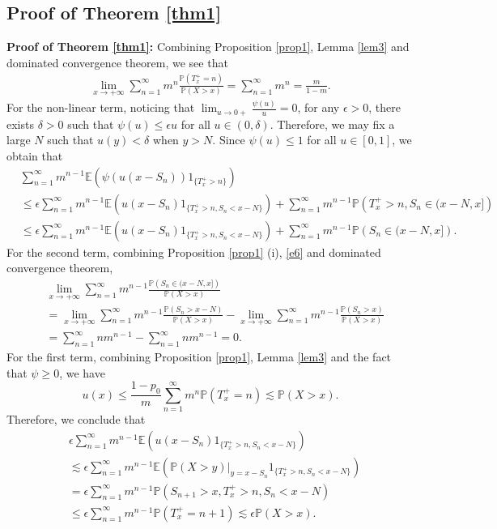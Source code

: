 \documentclass[11pt]{article}
\numberwithin{equation}{section}
\begin{document}
\subsection{Proof of Theorem \ref{thm1}}\label{S4.1}


\textbf{Proof of Theorem \ref{thm1}:} Combining Proposition \ref{prop1}, Lemma \ref{lem3} and dominated convergence theorem, we see that 
\begin{align}\label{e12-4}
	\lim_{x\to+\infty} \sum_{n=1}^\infty m^{n} \frac{ \mathbb{P}(T_x^+=n)}{\mathbb{P}(X>x)}=\sum_{n=1}^\infty m^{n} =\frac{m}{1-m}.
\end{align}
For the non-linear term, noticing that $\lim_{u\to 0+}\frac{\psi(u)}{u}=0$, for any $\epsilon>0$, there exists $\delta>0$ such that $\psi(u)\leq \epsilon u$ for all $u\in (0,\delta)$. Therefore, we may fix a large $N$ such that $u(y)<\delta$ when $y>N$.  Since $\psi(u)\leq 1$ for all $u\in [0,1]$, we obtain that 
\begin{align}\label{e12-1}
	& \sum_{n=1}^\infty m^{n-1}\mathbb{E}\left(\psi\left(u(x-S_n)\right)1_{\{T_x^+>n\}}\right) \nonumber\\
	& \leq \epsilon \sum_{n=1}^\infty m^{n-1}\mathbb{E}\left(u(x-S_n)1_{\{T_x^+>n, S_n<x-N\}}\right) +\sum_{n=1}^\infty m^{n-1}\mathbb{P}\left(T_x^+>n, S_n\in (x-N, x]\right) \nonumber\\
	& \leq \epsilon \sum_{n=1}^\infty m^{n-1}\mathbb{E}\left(u(x-S_n)1_{\{T_x^+>n, S_n<x-N\}}\right) +\sum_{n=1}^\infty m^{n-1}\mathbb{P}\left(S_n\in (x-N, x]\right).
\end{align}
For the second term, combining Proposition \ref{prop1} (i), \eqref{e6} and dominated convergence theorem,  
\begin{align}\label{e12-2}
	& \lim_{x\to+\infty} \sum_{n=1}^\infty m^{n-1}\frac{\mathbb{P}\left(S_n\in (x-N, x]\right)}{\mathbb{P}(X>x)} \nonumber\\
	& = \lim_{x\to+\infty} \sum_{n=1}^\infty m^{n-1}\frac{\mathbb{P}\left(S_n >x-N\right)}{\mathbb{P}(X>x)}  -\lim_{x\to+\infty} \sum_{n=1}^\infty m^{n-1}\frac{\mathbb{P}\left(S_n> x\right)}{\mathbb{P}(X>x)} \nonumber\\
	& = \sum_{n=1}^\infty n m^{n-1}- \sum_{n=1}^\infty n m^{n-1}=0.
\end{align}
For the first term, combining Proposition \ref{prop1}, Lemma \ref{lem3} and the fact that $\psi\geq 0$, we have 
\[
u(x)\leq \frac{1-p_0}{m}\sum_{n=1}^\infty m^{n} \mathbb{P}(T_x^+=n) \lesssim \mathbb{P}(X>x).
\]
Therefore, we conclude that 
\begin{align}\label{e12-3}
	&\epsilon \sum_{n=1}^\infty m^{n-1}\mathbb{E}\left(u(x-S_n)1_{\{T_x^+>n, S_n<x-N\}}\right) \nonumber\\
	& \lesssim \epsilon \sum_{n=1}^\infty m^{n-1}\mathbb{E}\left(\mathbb{P}\left( X>y\right)\big|_{y=x-S_n}1_{\{T_x^+>n, S_n<x-N\}}\right) \nonumber\\
	& = \epsilon \sum_{n=1}^\infty m^{n-1}\mathbb{P}\left( S_{n+1}>x, T_x^+>n, S_n<x-N\right) \nonumber\\
	&\leq  \epsilon \sum_{n=1}^\infty m^{n-1}\mathbb{P}\left(  T_x^+=n+1 \right) \lesssim \epsilon \mathbb{P}(X>x).
\end{align}
\end{document}
